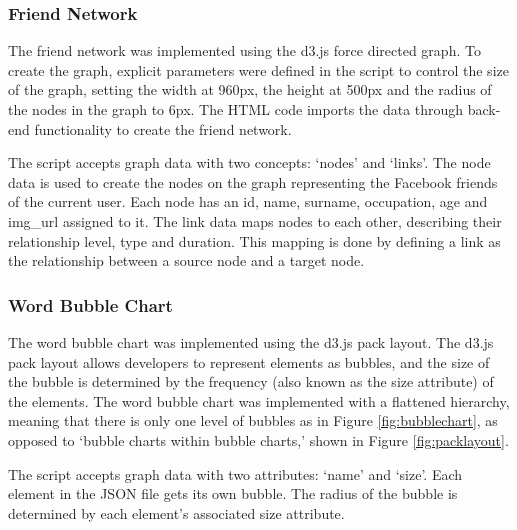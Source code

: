 \documentclass[12pt,onecolumn]{article}
\begin{document}
	\subsubsection{Friend Network}
	The friend network was implemented using the d3.js force directed graph. To create the graph, explicit parameters were defined in the script to control the size of the graph, setting the width at 960px, the height at 500px and the radius of the  nodes in the graph to 6px. The HTML code imports the data through back-end functionality to create the friend network. 
	
	The script accepts graph data with two concepts: `nodes' and `links'. The node data is used to create the nodes on the graph representing the Facebook friends of the current user. Each node has an id, name, surname, occupation, age and img\_url assigned to it. The link data maps nodes to each other, describing their relationship level, type and duration. This mapping is done by defining a link as the relationship between a source node and a target node.
	
	\subsubsection{Word Bubble Chart}
	The word bubble chart was implemented using the d3.js pack layout. The d3.js pack layout allows developers to represent elements as bubbles, and the size of the bubble is determined by the frequency (also known as the size attribute) of the elements. The word bubble chart was implemented with a flattened hierarchy, meaning that there is only one level of bubbles as in Figure \ref{fig:bubblechart}, as opposed to `bubble charts within bubble charts,' shown in Figure \ref{fig:packlayout}.
	
  	The script accepts graph data with two attributes: `name' and `size'. Each element in the JSON file gets its own bubble. The radius of the bubble is determined by each element's associated size attribute.
  	
\end{document}
